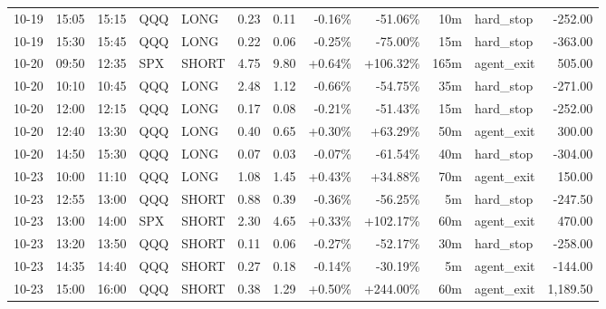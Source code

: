 \documentclass[11pt,a4paper,twoside]{article}
\begin{document}
\begin{center}
\begin{longtable}{>{\color{txtmain}}l l l l l r r r r r >{\color{txtmain}}l r}
10-19 & 15:05 & 15:15 & QQQ & LONG & 0.23 & 0.11 & \textcolor{lossred}{-0.16\%} & \textcolor{lossred}{-51.06\%} & 10m & hard\_stop & \textcolor{lossred}{-252.00} \\
10-19 & 15:30 & 15:45 & QQQ & LONG & 0.22 & 0.06 & \textcolor{lossred}{-0.25\%} & \textcolor{lossred}{-75.00\%} & 15m & hard\_stop & \textcolor{lossred}{-363.00} \\
10-20 & 09:50 & 12:35 & SPX & SHORT & 4.75 & 9.80 & \textcolor{wingreen}{+0.64\%} & \textcolor{wingreen}{+106.32\%} & 165m & agent\_exit & \textcolor{wingreen}{505.00} \\
10-20 & 10:10 & 10:45 & QQQ & LONG & 2.48 & 1.12 & \textcolor{lossred}{-0.66\%} & \textcolor{lossred}{-54.75\%} & 35m & hard\_stop & \textcolor{lossred}{-271.00} \\
10-20 & 12:00 & 12:15 & QQQ & LONG & 0.17 & 0.08 & \textcolor{lossred}{-0.21\%} & \textcolor{lossred}{-51.43\%} & 15m & hard\_stop & \textcolor{lossred}{-252.00} \\
10-20 & 12:40 & 13:30 & QQQ & LONG & 0.40 & 0.65 & \textcolor{wingreen}{+0.30\%} & \textcolor{wingreen}{+63.29\%} & 50m & agent\_exit & \textcolor{wingreen}{300.00} \\
10-20 & 14:50 & 15:30 & QQQ & LONG & 0.07 & 0.03 & \textcolor{lossred}{-0.07\%} & \textcolor{lossred}{-61.54\%} & 40m & hard\_stop & \textcolor{lossred}{-304.00} \\
10-23 & 10:00 & 11:10 & QQQ & LONG & 1.08 & 1.45 & \textcolor{wingreen}{+0.43\%} & \textcolor{wingreen}{+34.88\%} & 70m & agent\_exit & \textcolor{wingreen}{150.00} \\
10-23 & 12:55 & 13:00 & QQQ & SHORT & 0.88 & 0.39 & \textcolor{lossred}{-0.36\%} & \textcolor{lossred}{-56.25\%} & 5m & hard\_stop & \textcolor{lossred}{-247.50} \\
10-23 & 13:00 & 14:00 & SPX & SHORT & 2.30 & 4.65 & \textcolor{wingreen}{+0.33\%} & \textcolor{wingreen}{+102.17\%} & 60m & agent\_exit & \textcolor{wingreen}{470.00} \\
10-23 & 13:20 & 13:50 & QQQ & SHORT & 0.11 & 0.06 & \textcolor{lossred}{-0.27\%} & \textcolor{lossred}{-52.17\%} & 30m & hard\_stop & \textcolor{lossred}{-258.00} \\
10-23 & 14:35 & 14:40 & QQQ & SHORT & 0.27 & 0.18 & \textcolor{lossred}{-0.14\%} & \textcolor{lossred}{-30.19\%} & 5m & agent\_exit & \textcolor{lossred}{-144.00} \\
10-23 & 15:00 & 16:00 & QQQ & SHORT & 0.38 & 1.29 & \textcolor{wingreen}{+0.50\%} & \textcolor{wingreen}{+244.00\%} & 60m & agent\_exit & \textcolor{wingreen}{1,189.50} \\

\end{longtable}
\end{center}
\end{document}

